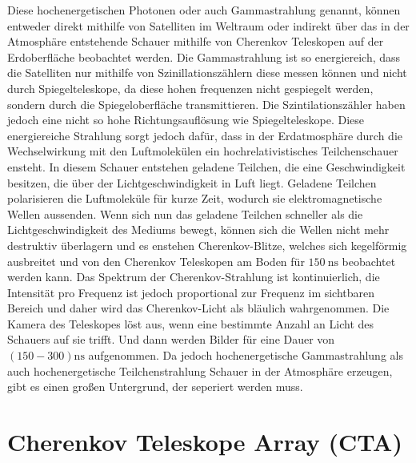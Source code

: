 Diese hochenergetischen Photonen oder auch Gammastrahlung genannt, können entweder direkt mithilfe von Satelliten im Weltraum oder indirekt über das in
der Atmosphäre entstehende Schauer mithilfe von Cherenkov Teleskopen auf der Erdoberfläche beobachtet werden.
Die Gammastrahlung ist so energiereich, dass die Satelliten nur mithilfe von Szinillationszählern diese messen können und nicht durch Spiegelteleskope,
da diese hohen frequenzen nicht gespiegelt werden, sondern durch die Spiegeloberfläche transmittieren. Die Szintilationszähler haben jedoch eine nicht
so hohe Richtungsauflösung wie Spiegelteleskope.
Diese energiereiche Strahlung sorgt jedoch dafür, dass in der Erdatmosphäre durch die Wechselwirkung mit den Luftmolekülen ein hochrelativistisches
Teilchenschauer ensteht.
In diesem Schauer entstehen geladene Teilchen, die eine Geschwindigkeit besitzen, die über der Lichtgeschwindigkeit in Luft liegt.
Geladene Teilchen polarisieren die Luftmoleküle für kurze Zeit, wodurch sie elektromagnetische Wellen aussenden.
Wenn sich nun das geladene Teilchen schneller als die Lichtgeschwindigkeit des Mediums bewegt, können sich die Wellen nicht mehr destruktiv
überlagern und es enstehen Cherenkov-Blitze, welches sich kegelförmig ausbreitet und von den Cherenkov Teleskopen am Boden für $\SI{150}{\nano\s}$\cite{Cherenkov_Licht}
beobachtet werden kann.
Das Spektrum der Cherenkov-Strahlung ist kontinuierlich, die Intensität pro Frequenz ist jedoch proportional zur Frequenz im sichtbaren Bereich und
daher wird das Cherenkov-Licht als bläulich wahrgenommen.
Die Kamera des Teleskopes löst aus, wenn eine bestimmte Anzahl an Licht des Schauers auf sie trifft. Und dann werden Bilder für eine Dauer von
$(150-300)\si{\nano\s}$ aufgenommen.
Da jedoch hochenergetische Gammastrahlung als auch hochenergetische Teilchenstrahlung
Schauer in der Atmosphäre erzeugen, gibt es einen großen Untergrund, der seperiert werden muss.

\section{Cherenkov Teleskope Array (CTA)}

